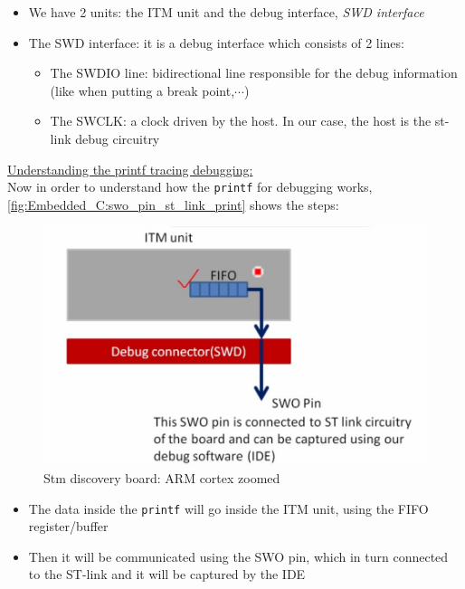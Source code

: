 \begin{itemize}
    \item We have 2 units: the ITM unit and the debug interface, \textit{SWD interface}
    
    \item The SWD interface: it is a debug interface which consists of 2 lines:
    
    \begin{itemize}
        \item The SWDIO line: bidirectional line responsible for the debug information (like when putting a break point,$\cdots$)
        
        \item The SWCLK: a clock driven by the host.  In  our case, the host is the st-link debug circuitry
    \end{itemize}
    
\end{itemize}

\newpage
\underline{Understanding the printf tracing debugging:}\\

Now in order to understand how the \verb|printf| for debugging works, \autoref{fig:Embedded_C:swo_pin_st_link_print} shows the steps:

\begin{figure}[h]
\centering
\includegraphics[scale=0.5]{Figures/Embedded_C/swo_pin_st_link_print}
\caption{Stm discovery board: ARM cortex zoomed}
\label{fig:Embedded_C:swo_pin_st_link_print}
\end{figure}  


\begin{itemize}
    \item The data inside the \verb|printf| will go inside the ITM unit, using the FIFO register/buffer
    
    \item Then it will be communicated using the SWO pin, which in turn connected to the ST-link and it will be captured by the IDE
\end{itemize}

